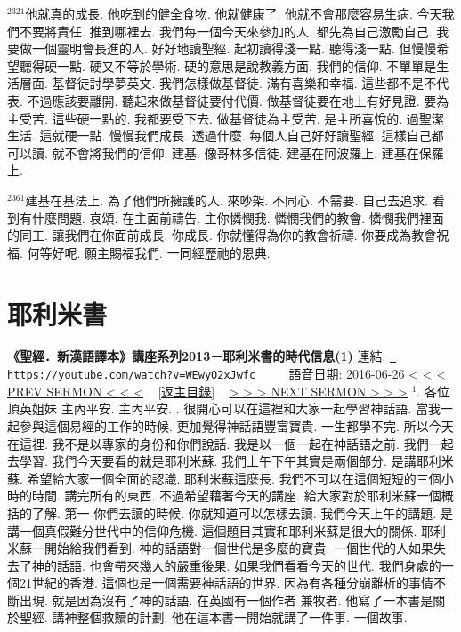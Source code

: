 \documentclass{book}
\begin{document}
$^{2321}$他就真的成長.
他吃到的健全食物.
他就健康了.
他就不會那麼容易生病.
今天我們不要將責任.
推到哪裡去.
我們每一個今天來參加的人.
都先為自己激勵自己.
我要做一個靈明會長進的人.
好好地讀聖經.
起初讀得淺一點.
聽得淺一點.
但慢慢希望聽得硬一點.
硬又不等於學術.
硬的意思是說教義方面.
我們的信仰.
不單單是生活層面.
基督徒討學夢英文.
我們怎樣做基督徒.
滿有喜樂和幸福.
這些都不是不代表.
不過應該要離開.
聽起來做基督徒要付代價.
做基督徒要在地上有好見證.
要為主受苦.
這些硬一點的.
我都要受下去.
做基督徒為主受苦.
是主所喜悅的.
過聖潔生活.
這就硬一點.
慢慢我們成長.
透過什麼.
每個人自己好好讀聖經.
這樣自己都可以讀.
就不會將我們的信仰.
建基.
像哥林多信徒.
建基在阿波羅上.
建基在保羅上.

$^{2361}$建基在基法上.
為了他們所擁護的人.
來吵架.
不同心.
不需要.
自己去追求.
看到有什麼問題.
哀頌.
在主面前禱告.
主你憐憫我.
憐憫我們的教會.
憐憫我們裡面的同工.
讓我們在你面前成長.
你成長.
你就懂得為你的教會祈禱.
你要成為教會祝福.
何等好呢.
願主賜福我們.
一同經歷祂的恩典.
\newpage



\section{耶利米書}
\label{sec:WEwyO2xJwfc}
\textbf{《聖經．新漢語譯本》講座系列2013－耶利米書的時代信息(1)}
\newline
\newline
連結: \href{https://youtube.com/watch?v=WEwyO2xJwfc}{\texttt{ https://youtube.com/watch?v=WEwyO2xJwfc}} ~~~~ 語音日期: 2016-06-26 
\newline
\newline
\hyperref[sec:L7Klx5S64nM]{\small{< < < PREV SERMON < < <}}
~
\hyperref[sec:index]{\small{[返主目錄]}}
~
\hyperref[sec:7tQS0En6sh8]{\small{> > > NEXT SERMON > > >}}
\newline
\newline
$^{1}$.
各位頂英姐妹 主內平安.
主內平安.
.
很開心可以在這裡和大家一起學習神話語.
當我一起參與這個易經的工作的時候.
更加覺得神話語豐富寶貴.
一生都學不完.
所以今天在這裡.
我不是以專家的身份和你們說話.
我是以一個一起在神話語之前.
我們一起去學習.
我們今天要看的就是耶利米蘇.
我們上午下午其實是兩個部分.
是講耶利米蘇.
希望給大家一個全面的認識.
耶利米蘇這麼長.
我們不可以在這個短短的三個小時的時間.
講完所有的東西.
不過希望藉著今天的講座.
給大家對於耶利米蘇一個概括的了解.
第一 你們去讀的時候.
你就知道可以怎樣去讀.
我們今天上午的講題.
是講一個真假難分世代中的信仰危機.
這個題目其實和耶利米蘇是很大的關係.
耶利米蘇一開始給我們看到.
神的話語對一個世代是多麼的寶貴.
一個世代的人如果失去了神的話語.
也會帶來幾大的嚴重後果.
如果我們看看今天的世代.
我們身處的一個21世紀的香港.
這個也是一個需要神話語的世界.
因為有各種分崩離析的事情不斷出現.
就是因為沒有了神的話語.
在英國有一個作者 兼牧者.
他寫了一本書是關於聖經.
講神整個救贖的計劃.
他在這本書一開始就講了一件事.
一個故事.
\end{document}
